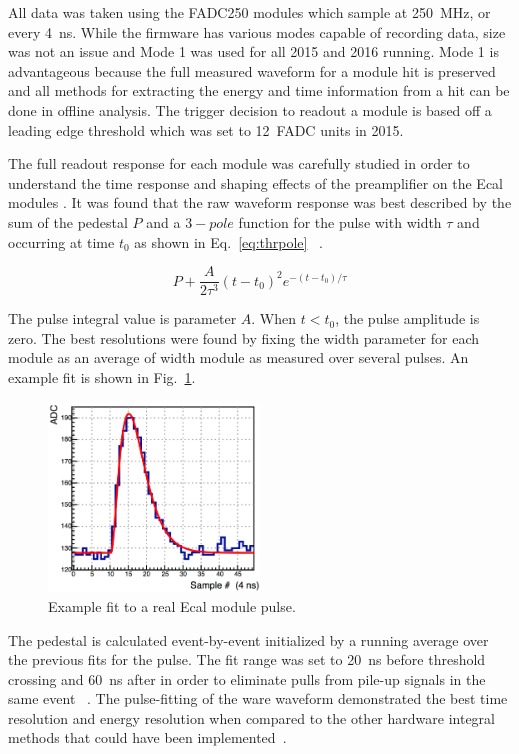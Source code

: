 \documentclass[12pt]{report}
\begin{document}
All data was taken using the FADC250 modules which sample at 250~MHz, or every 4~ns. While the firmware has various modes capable of recording data, size was not an issue and Mode 1 was used for all 2015 and 2016 running. Mode 1 is advantageous because the full measured waveform for a module hit is preserved and all methods for extracting the energy and time information from a hit can be done in offline analysis. The trigger decision to readout a module is based off a leading edge threshold which was set to 12~FADC units in 2015. 

The full readout response for each module was carefully studied in order to understand the time response and shaping effects of the preamplifier on the Ecal modules \cite{Charles}. It was found that the raw waveform response was best described by the sum of the pedestal $P$ and a $3-pole$ function for the pulse with width $\tau$ and occurring at time $t_0$ as shown in Eq.~\eqref{eq:thrpole} ~\cite{Charles}.

\begin{equation}
	\label{eq:thrpole}
	P + \dfrac{A}{2\tau^3}(t-t_0)^2e^{-(t-t_0)/\tau} 
\end{equation}

The pulse integral value is parameter $A$. When $t<t_0$, the pulse amplitude is zero. The best resolutions were found by fixing the width parameter for each module as an average of width module as measured over several pulses. An example fit is shown in Fig.~\ref{Figure:mode1fit}.

\begin{figure}[H]
  \centering
      \includegraphics[width=0.5\textwidth]{pics/performance/mode1fit.png}
  \caption[Pulse-fitting to Mode-1 Ecal data]{Example fit to a real Ecal module pulse.}
  \label{Figure:mode1fit}
\end{figure}

The pedestal is calculated event-by-event initialized by a running average over the previous fits for the pulse. The fit range was set to 20~ns before threshold crossing and 60~ns after in order to eliminate pulls from pile-up signals in the same event ~\cite{Baltzell}. The pulse-fitting of the ware waveform demonstrated the best time resolution and energy resolution when compared to the other hardware integral methods that could have been implemented~\cite{Baltzell}.
\end{document}
